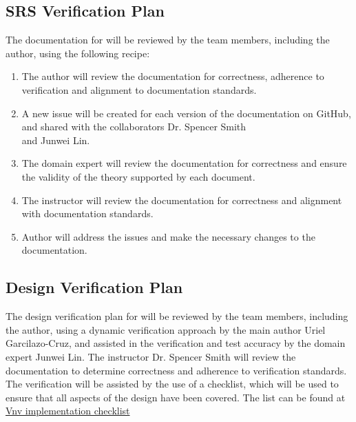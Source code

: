 \documentclass[12pt, titlepage]{article}
\begin{document}
\subsection{SRS Verification Plan}

The documentation for \progname{} will be reviewed by the team members, including the author,
using the following recipe:

\begin{enumerate}
  \item The author will review the documentation for correctness, adherence to verification and alignment to documentation standards.
  \item A new issue will be created for each version of the documentation on GitHub, and shared with the collaborators Dr. Spencer Smith \\
   and Junwei Lin.
  \item The domain expert will review the documentation for correctness and ensure the validity of the theory supported by each document.
  \item The instructor will review the documentation for correctness and alignment with documentation standards.
  \item Author will address the issues and make the necessary changes to the documentation.
\end{enumerate}




\subsection{Design Verification Plan}

The design verification plan for \progname{} will be reviewed by the team members, including the author,
using a dynamic verification approach by the main author Uriel Garcilazo-Cruz, and assisted in the 
verification and test accuracy by the domain expert Junwei Lin. The instructor Dr. Spencer Smith will 
review the documentation to determine correctness and adherence to verification standards. The verification will 
be assisted by the use of a checklist, which will be used to ensure that all aspects of the design have been covered.
The list can be found at \href{https://github.com/UGarCil/UGarcil_capstone/blob/main/docs/Checklists/VnV-Checklist.pdf}{Vnv implementation checklist}
\end{document}

